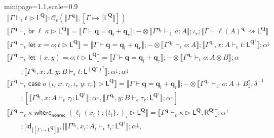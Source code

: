 \documentclass[acmsmall,screen,anonymous,review]{acmart}
\newcommand{\mc}[1]{\ensuremath{\mathcal{#1}}}
\newcommand{\mb}[1]{\ensuremath{\mathbf{#1}}}
\newcommand{\ms}[1]{\ensuremath{\mathsf{#1}}}
\newcommand{\lto}{:}
\newcommand{\linl}[1]{\iota_l\;{#1}}
\newcommand{\linr}[1]{\iota_r\;{#1}}
\newcommand{\letstmt}[3]{\ensuremath{\ms{let}\;#1 = #2; #3}}
\newcommand{\brb}[2]{\ms{br}\;#1\;#2}
\newcommand{\casestmt}[5]{\ms{case}\;#1\;\{\linl{#2} \lto #3, \linr{#4} \lto #5\}}
\newcommand{\awhere}[2]{#1\;\ms{where}_{\ms{nonrec}}\;#2}
\newcommand{\wbranch}[3]{#1(#2) \lto \{#3\}}
\newcommand{\qsp}[4]{#1 \vdash #2 = #3 + #4}
\newcommand{\lwk}[3]{#1 \vdash #2 \rightsquigarrow #3}
\newcommand{\lhyp}[2]{#1(#2)}
\newcommand{\hasty}[4]{#1 \vdash_{#2} #3: {#4}}
\newcommand{\haslb}[4]{#1 \vdash_{#2} #3 \rhd #4}
\newcommand{\ltoty}[2]{[#1 \mapsto #2]}
\newcommand{\dnt}[1]{\llbracket{#1}\rrbracket}
\newcommand{\zeroqv}[1]{#1^\uparrow}
\begin{document}
\begin{figure}
  \begin{adjustbox}{minipage=1.1\textwidth,scale=0.9}
  \begin{gather*}
    \boxed{\dnt{\haslb{\Gamma}{\epsilon}{t}{\ms{L}^{\mb{Q}}}}
    : \mc{C}_\epsilon(\dnt{\Gamma^{\mb{q}}}, \ltoty{\Gamma}{\dnt{\ms{L}^{\mb{Q}}}})} \\
    \dnt
    {\haslb{\Gamma^{\mb{q}}}{\epsilon}{\brb{\ell}{a}}{\ms{L}^{\mb{Q}}}}
    = \dnt{\qsp{\Gamma}{\mb{q}}{\mb{q}_l}{\mb{q}_r}}
    ; - \otimes \dnt{\hasty{\Gamma^{\mb{q}_r}}{\bot}{a}{A}}
    ; \iota_r
    ; \dnt{\lwk{\Gamma}{\lhyp{\ell}{A}^{\mb{q}_l}}{\ms{L}^{\mb{Q}}}}
    \\
    \dnt
    {\haslb{\Gamma^{\mb{q}}}{\epsilon}{\letstmt{x}{o}{t}}{\ms{L}^{\mb{Q}}}}
    =
    \dnt{\qsp{\Gamma}{\mb{q}}{\mb{q}_l}{\mb{q}_r}}
    ; - \otimes \dnt{\hasty{\Gamma^{\mb{q}_r}}{\epsilon}{o}{A}}
    ; \dnt{\hasty{\Gamma^{\mb{q}_l}, x : A}{\epsilon}{t}{\ms{L}^{\zeroqv{\mb{Q}}}}}
    ; \alpha^\downarrow \\
    \dnt
    {\haslb{\Gamma^{\mb{q}}}{\epsilon}{\letstmt{(x, y)}{o}{t}}{\ms{L}^{\mb{Q}}}}
    =
    \dnt{\qsp{\Gamma}{\mb{q}}{\mb{q}_l}{\mb{q}_r}}
    ; - \otimes \dnt{\hasty{\Gamma^{\mb{q}_r}}{\epsilon}{o}{A \otimes B}}
    ; \alpha
    \\
    \qquad 
    ; \dnt{\hasty{\Gamma^{\mb{q}_l}, x : A, y : B}{\epsilon}{t}
      {\ms{L}^{\zeroqv{(\zeroqv{\mb{Q}})}}}}
    ; \alpha^\downarrow ; \alpha^\downarrow
    \\
    \dnt
    {\haslb{\Gamma^{\mb{q}}}{\epsilon}{\casestmt{o}{x}{\tau_l}{y}{\tau_r}}
      {\ms{L}^{\mb{Q}}}}
    = \dnt{\qsp{\Gamma}{\mb{q}}{\mb{q}_l}{\mb{q}_r}}
    ; - \otimes \dnt{\hasty{\Gamma^{\mb{q}_r}}{\bot}{o}{A + B}}
    ; \delta^{-1}
    \\
    \qquad
    ; [
      \dnt{\hasty{\Gamma^{\mb{q}_l}, x : A}{\epsilon}{\tau_l}{\ms{L}^{\zeroqv{\mb{Q}}}}}
        ; \alpha^\downarrow,
      \dnt{\hasty{\Gamma^{\mb{q}_l}, y : B}{\epsilon}{\tau_r}{\ms{L}^{\zeroqv{\mb{Q}}}}}
        ; \alpha^\downarrow
    ]
    \\
    \dnt
    {\haslb{\Gamma^{\mb{q}}}{\epsilon}{\awhere{\kappa}{(\wbranch{\ell_i}{x_i}{t_i},)_i}}
      {\ms{L}^{\mb{Q}}}}
    =
    \dnt{\haslb{\Gamma^{\mb{q}}}{\epsilon}{\kappa}
      {\ms{L}^{\mb{Q}}, \ms{R}^{\mb{Q}'}}} ; \alpha^+
    \\ 
    \qquad ; [
      \ms{id}_{\dnt{\ltoty{\Gamma}{\ms{L}^{\mb{Q}}}}},
      [
        \dnt{\hasty{\Gamma^{\mb{q}_i}, x_i : A_i}{\epsilon}{t_i}
          {\ms{L}^{\zeroqv{\mb{Q}}}}} ; \alpha^\downarrow,

\end{gather*}
\end{adjustbox}
\end{figure}
\end{document}
